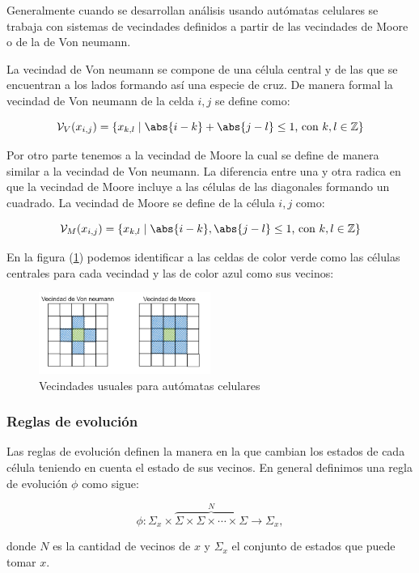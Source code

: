 Generalmente cuando se desarrollan análisis usando autómatas celulares se trabaja con sistemas de vecindades definidos a partir de las vecindades de Moore o de la de Von neumann. 

La vecindad de Von neumann se compone de una célula central y de las que se encuentran a los lados formando así una especie de cruz. De manera formal la vecindad de Von neumann de la celda $i,j$ se define como:

$$\mathcal{V}_V(x_{i,j}) = \{x_{k,l}\mid\abs{i-k}+\abs{j-l}\leq1\text{, con }k,l\in\mathbb{Z}\}$$

Por otro parte tenemos a la vecindad de Moore la cual se define de manera similar a la vecindad de Von neumann. La diferencia entre una y otra radica en que la vecindad de Moore incluye a las células de las diagonales formando un cuadrado. La vecindad de Moore se define  de la célula $i,j$ como:

$$\mathcal{V}_M(x_{i,j}) = \{x_{k,l}\mid\abs{i-k},\abs{j-l}\leq1\text{, con }k,l\in\mathbb{Z}\}$$

En la figura (\ref{fig:Moore - Von neumann}) podemos identificar a las celdas de color verde como las células centrales para cada vecindad y las de color azul como sus vecinos:

\begin{figure}[h]
  \centering
    \includegraphics[width=0.5\textwidth]{Imagenes/vecindades.PNG}
  \caption{Vecindades usuales para autómatas celulares}
  \label{fig:Moore - Von neumann}
\end{figure}

\subsubsection{Reglas de evolución}

Las reglas de evolución definen la manera en la que cambian los estados de cada célula teniendo en cuenta el estado de sus vecinos. En general definimos una regla de evolución $\phi$ como sigue:

$$\phi:\Sigma_x\times\overbrace{\Sigma\times\Sigma\times\cdots\times\Sigma}^{N}\longrightarrow\Sigma_x,$$

donde $N$ es la cantidad de vecinos de $x$ y $\Sigma_x$ el conjunto de estados que puede tomar $x$. 

